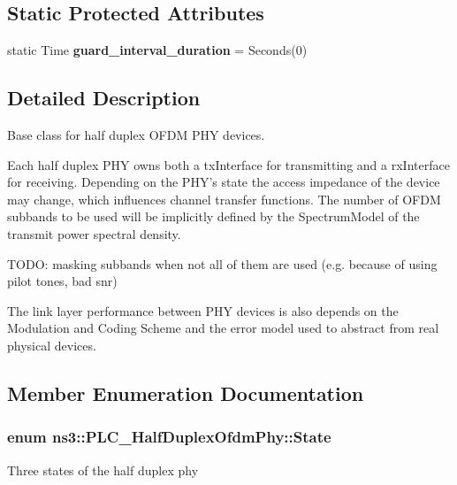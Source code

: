 \subsection*{\-Static \-Protected \-Attributes}
\begin{DoxyCompactItemize}
\item 
\hypertarget{classns3_1_1PLC__HalfDuplexOfdmPhy_a9326e8671fc183ee09d6dc35800f2a9b}{static \-Time {\bfseries guard\-\_\-interval\-\_\-duration} = \-Seconds(0)}\label{classns3_1_1PLC__HalfDuplexOfdmPhy_a9326e8671fc183ee09d6dc35800f2a9b}

\end{DoxyCompactItemize}


\subsection{\-Detailed \-Description}
\-Base class for half duplex \-O\-F\-D\-M \-P\-H\-Y devices. 

\-Each half duplex \-P\-H\-Y owns both a tx\-Interface for transmitting and a rx\-Interface for receiving. \-Depending on the \-P\-H\-Y's state the access impedance of the device may change, which influences channel transfer functions. \-The number of \-O\-F\-D\-M subbands to be used will be implicitly defined by the \-Spectrum\-Model of the transmit power spectral density.

\-T\-O\-D\-O\-: masking subbands when not all of them are used (e.\-g. because of using pilot tones, bad snr)

\-The link layer performance between \-P\-H\-Y devices is also depends on the \-Modulation and \-Coding \-Scheme and the error model used to abstract from real physical devices. 

\subsection{\-Member \-Enumeration \-Documentation}
\hypertarget{classns3_1_1PLC__HalfDuplexOfdmPhy_ae91e168f9a51bf5344e7e03d9ae13b60}{
\subsubsection[{\-State}]{\setlength{\rightskip}{0pt plus 5cm}enum {\bf ns3\-::\-P\-L\-C\-\_\-\-Half\-Duplex\-Ofdm\-Phy\-::\-State}}}\label{classns3_1_1PLC__HalfDuplexOfdmPhy_ae91e168f9a51bf5344e7e03d9ae13b60}
\-Three states of the half duplex phy 

